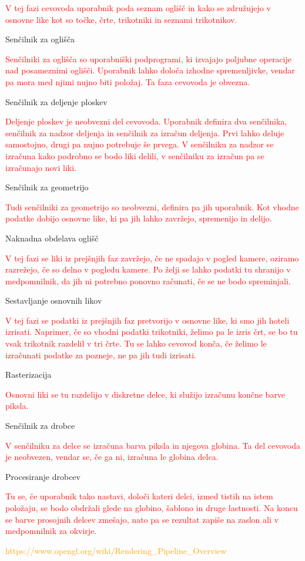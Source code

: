 \documentclass[a4paper, 12pt]{book}
\begin{document}
\begin{description}
\item [Specifikacija oglišč] 

\textcolor{red}{V tej fazi cevovoda uporabnik poda seznam oglišč in kako se združujejo v osnovne like kot so točke, črte, trikotniki in seznami trikotnikov.}
\item Senčilnik za oglišča

\textcolor{red}{
Senčilniki za oglišča so uporabniški podprogrami, ki izvajajo poljubne operacije nad posameznimi oglišči. Uporabnik lahko določa izhodne spremenljivke, vendar pa mora med njimi nujno biti položaj. Ta faza cevovoda je obvezna.}
\item Senčilnik za deljenje ploskev

\textcolor{red}{
Deljenje ploskev je neobvezni del cevovoda. Uporabnik definira dva senčilnika, senčilnik za nadzor deljenja in senčilnik za izračun deljenja. Prvi lahko deluje samostojno, drugi pa nujno potrebuje še prvega. V senčilniku za nadzor se izračuna kako podrobno se bodo liki delili, v senčilniku za izračun pa se izračunajo novi liki.}
\item Senčilnik za geometrijo

\textcolor{red}{
Tudi senčilniki za geometrijo so neobvezni, definira pa jih uporabnik. Kot vhodne podatke dobijo osnovne like, ki pa jih lahko zavržejo, spremenijo in delijo.}
\item Naknadna obdelava oglišč

\textcolor{red}{
V tej fazi se liki iz prejšnjih faz zavržejo, če ne spadajo v pogled kamere, oziramo razrežejo, če so delno v pogledu kamere. Po želji se lahko podatki tu shranijo v medpomnilnik, da jih ni potrebno ponovno računati, če se ne bodo spreminjali.}
\item Sestavljanje osnovnih likov

\textcolor{red}{
V tej fazi se podatki iz prejšnjih faz pretvorijo v osnovne like, ki smo jih hoteli izrisati. Naprimer, če so vhodni podatki trikotniki, želimo pa le izris črt, se bo tu vsak trikotnik razdelil v tri črte. Tu se lahko cevovod konča, če želimo le izračunati podatke za pozneje, ne pa jih tudi izrisati. }
\item Rasterizacija

\textcolor{red}{
Osnovni liki se tu razdelijo v diskretne delce, ki služijo izračunu končne barve piksla.}
\item Senčilnik za drobce

\textcolor{red}{
V senčilniku za delce se izračuna barva piksla in njegova globina. Ta del cevovoda je neobvezen, vendar se, če ga ni, izračuna le globina delca.}
\item Procesiranje drobcev

\textcolor{red}{
Tu se, če uporabnik tako nastavi, določi kateri delci, izmed tistih na istem položaju, se bodo obdržali glede na globino, šablono in druge lastnosti. Na koncu se barve prosojnih delcev zmešajo, nato pa se rezultat zapiše na zaslon ali v medpomnilnik za okvirje.}
\end{description}
\textcolor{orange}{https://www.opengl.org/wiki/Rendering\_Pipeline\_Overview}
\end{document}
